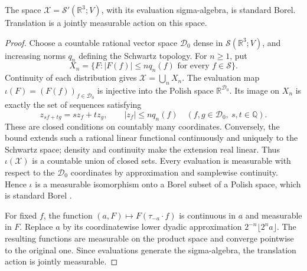 \documentclass[11pt,letterpaper,reqno]{amsart}
\newcommand{\R}{\mathbb R}
\newcommand{\Q}{\mathbb Q}
\begin{document}
\begin{lemma}\label{lem:standard-borel}
The space \(\mathcal X=\mathcal S'(\R^3;V)\), with its evaluation
sigma-algebra, is standard Borel. Translation is a jointly measurable
action on this space.
\end{lemma}
\begin{proof}
Choose a countable rational vector space \(\mathcal D_0\) dense in
\(\mathcal S(\R^3;V)\), and increasing norms \(q_n\) defining the
Schwartz topology. For \(n\ge1\), put
\[
 X_n=\{F:|F(f)|\le n q_n(f)\text{ for every }f\in\mathcal S\}.
\]
Continuity of each distribution gives \(\mathcal X=\bigcup_nX_n\).
The evaluation map
\(\iota(F)=(F(f))_{f\in\mathcal D_0}\) is injective into the
Polish space \(\R^{\mathcal D_0}\).
Its image on \(X_n\) is exactly the set of sequences satisfying
\[
 z_{sf+tg}=sz_f+tz_g,\qquad |z_f|\le n q_n(f)
 \quad(f,g\in\mathcal D_0,\ s,t\in\Q).
\]
These are closed conditions on countably many coordinates.
Conversely, the bound extends such a rational linear functional
continuously and uniquely to the Schwartz space; density and
continuity make the extension real linear.
Thus \(\iota(\mathcal X)\) is a countable union of closed sets.
Every evaluation is measurable with respect to the
\(\mathcal D_0\) coordinates by approximation and samplewise
continuity. Hence \(\iota\) is a measurable isomorphism onto a
Borel subset of a Polish space, which is standard Borel
\cite[Theorem~2.1.22]{Durrett2019}.

For fixed \(f\), the function
\((a,F)\mapsto F(\tau_{-a}\cdot f)\) is continuous in \(a\) and
measurable in \(F\). Replace \(a\) by its coordinatewise lower
dyadic approximation \(2^{-n}\lfloor2^na\rfloor\).
The resulting functions are measurable on the product space and
converge pointwise to the original one. Since evaluations generate
the sigma-algebra, the translation action is jointly measurable.
\end{proof}
\end{document}
